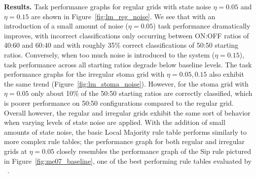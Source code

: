 \documentclass[a4paper,11pt]{article}
\begin{document}
\medskip

\noindent \textbf{Results.} Task performance graphs for regular grids with state noise $\eta=0.05$ and $\eta=0.15$ are shown in Figure~\ref{fig:lm_reg_noise}. We see that with an introduction of a small amount of noise ($\eta=0.05$) task performance dramatically improves, with incorrect classifications only occurring between ON:OFF ratios of 40:60 and 60:40 and with roughly 35\% correct classifications of 50:50 starting ratios. Conversely, when too much noise is introduced to the system ($\eta=0.15$), task performance across all starting ratios degrade below baseline levels. The task performance graphs for the irregular stoma grid with $\eta=0.05, 0.15$ also exhibit the same trend (Figure~\ref{fig:lm_stoma_noise}). However, for the stoma grid with $\eta=0.05$ only about 10\% of the 50:50 starting ratios are correctly classified, which is poorer performance on 50:50 configurations compared to the regular grid. Overall however, the regular and irregular grids exhibit the same sort of behavior when varying levels of state noise are applied. With the addition of small amounts of state noise, the basic Local Majority rule table performs similarly to more complex rule tables; the performance graph for both regular and irregular grids at $\eta=0.05$ closely resembles the performance graph of the Sip rule pictured in Figure~\ref{fig:me07_baseline}, one of the best performing rule tables evaluated by \citeauthor{me07}~\cite{me07}.
\end{document}
